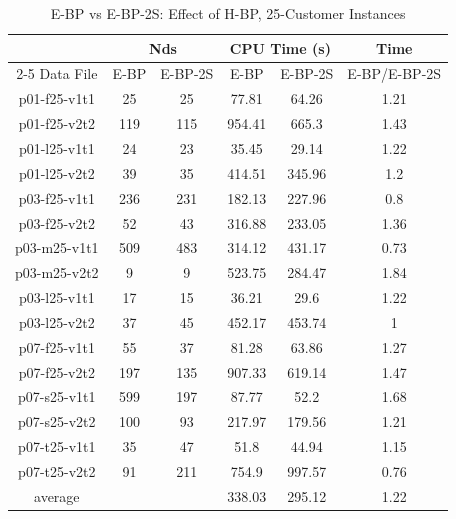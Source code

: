 \begin{table}[!h]
\centering
\caption{E-BP vs E-BP-2S: Effect of H-BP, 25-Customer Instances}\label{hbp-table25}
\begin {tabular}[!h]{|c|c|c|c|c|c|}
\hline
\mbox{}   & \multicolumn{2}{|c|}{Nds} & \multicolumn{2}{|c|}{CPU Time (s)} & Time  \\\cline{2-5}
Data File & E-BP  & E-BP-2S & E-BP  & E-BP-2S & E-BP/E-BP-2S \\\hline
p01-f25-v1t1 &  25   &  25   &  77.81   &  64.26   &    1.21    \\
p01-f25-v2t2 &  119  &  115  &  954.41  &  665.3   &    1.43    \\
p01-l25-v1t1 &  24   &  23   &  35.45   &  29.14   &    1.22    \\
p01-l25-v2t2 &  39   &  35   &  414.51  &  345.96  &    1.2 \\
p03-f25-v1t1 &  236  &  231  &  182.13  &  227.96  &    0.8 \\
p03-f25-v2t2 &  52   &  43   &  316.88  &  233.05  &    1.36    \\
p03-m25-v1t1 &  509  &  483  &  314.12  &  431.17  &    0.73    \\
p03-m25-v2t2 &  9    &  9    &  523.75  &  284.47  &    1.84    \\
p03-l25-v1t1 &  17   &  15   &  36.21   &  29.6    &    1.22    \\
p03-l25-v2t2 &  37   &  45   &  452.17  &  453.74  &    1   \\
p07-f25-v1t1 &  55   &  37   &  81.28   &  63.86   &    1.27    \\
p07-f25-v2t2 &  197  &  135  &  907.33  &  619.14  &    1.47    \\
p07-s25-v1t1 &  599  &  197  &  87.77   &  52.2    &    1.68    \\
p07-s25-v2t2 &  100  &  93   &  217.97  &  179.56  &    1.21    \\
p07-t25-v1t1 &  35   &  47   &  51.8    &  44.94   &    1.15    \\
p07-t25-v2t2 &  91   &  211  &  754.9   &  997.57  &    0.76    \\\hline
average & \mbox{}   & \mbox{} & 338.03  &  295.12  &    1.22    \\\hline
\end{tabular}
\end{table}

